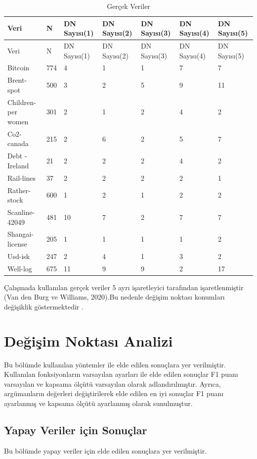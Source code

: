 \documentclass[12pt,twoside]{deuthesis}
\begin{document}
\begin{longtable}[]{@{}lllllll@{}}
\caption{\label{tab:ngercek} Gerçek Veriler}\tabularnewline
\toprule
Veri & N & DN Sayısı(1) & DN Sayısı(2) & DN Sayısı(3) & DN Sayısı(4) & DN Sayısı(5)\tabularnewline
\midrule
\endfirsthead
\toprule
Veri & N & DN Sayısı(1) & DN Sayısı(2) & DN Sayısı(3) & DN Sayısı(4) & DN Sayısı(5)\tabularnewline
\midrule
\endhead
Bitcoin & 774 & 4 & 1 & 1 & 7 & 7\tabularnewline
Brent-spot & 500 & 3 & 2 & 5 & 9 & 11\tabularnewline
Children-per women & 301 & 2 & 1 & 2 & 4 & 2\tabularnewline
Co2- canada & 215 & 2 & 6 & 2 & 5 & 7\tabularnewline
Debt -Ireland & 21 & 2 & 2 & 2 & 4 & 2\tabularnewline
Rail-lines & 37 & 2 & 2 & 2 & 2 & 1\tabularnewline
Rather-stock & 600 & 1 & 2 & 1 & 2 & 2\tabularnewline
Scanline-42049 & 481 & 10 & 7 & 2 & 7 & 7\tabularnewline
Shangai-license & 205 & 1 & 1 & 1 & 1 & 2\tabularnewline
Usd-isk & 247 & 2 & 4 & 1 & 3 & 2\tabularnewline
Well-log & 675 & 11 & 9 & 9 & 2 & 17\tabularnewline
\bottomrule
\end{longtable}

Çalışmada kullanılan gerçek veriler 5 ayrı işaretleyici tarafından işaretlenmiştir (Van den Burg ve Williams, 2020).Bu nedenle değişim noktası konumları değişiklik göstermektedir .

\hypertarget{deux11fiux15fim-noktasux131-analizi}{%
\section{Değişim Noktası Analizi}\label{deux11fiux15fim-noktasux131-analizi}}

Bu bölümde kullanılan yöntemler ile elde edilen sonuçlara yer verilmiştir. Kullanılan fonksiyonların varsayılan ayarları ile elde edilen sonuçlar F1 puanı varsayılan ve kapsama ölçütü varsayılan olarak adlandırılmıştır. Ayrıca, argümanların değerleri değiştirilerek elde edilen en iyi sonuçlar F1 puanı ayarlanmış ve kapsama ölçütü ayarlanmış olarak sunulmuştur.

\hypertarget{yapay-veriler-iuxe7in-sonuuxe7lar}{%
\subsection{Yapay Veriler için Sonuçlar}\label{yapay-veriler-iuxe7in-sonuuxe7lar}}

Bu bölümde yapay veriler için elde edilen sonuçlara yer verilmiştir.
\end{document}
